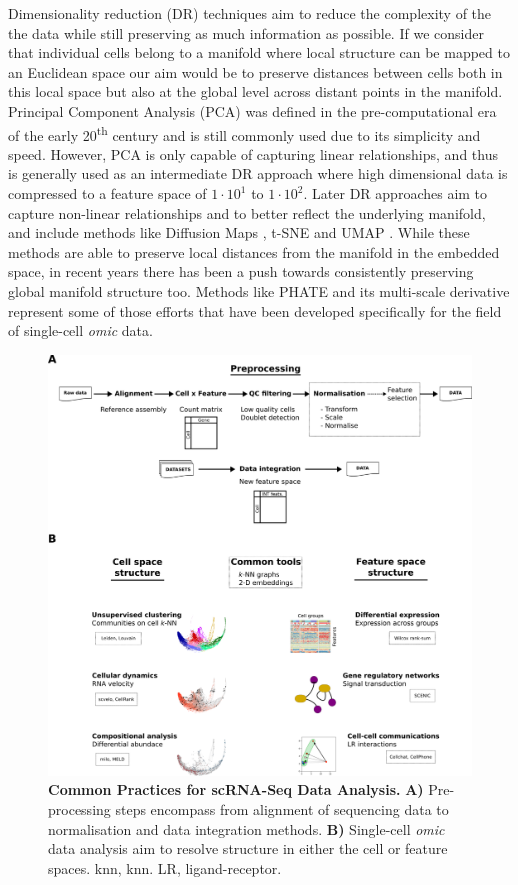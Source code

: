 Dimensionality reduction (DR) techniques aim to reduce the complexity of the the data while still preserving as much information as possible. If we consider that individual cells belong to a manifold where local structure can be mapped to an Euclidean space our aim would be to preserve distances between cells both in this local space but also at the global level across distant points in the manifold. Principal Component Analysis (PCA) \cite{pearson_liii_1901,jolliffe_principal_2016} was defined in the pre-computational era of the early 20\textsuperscript{th} century and is still commonly used due to its simplicity and speed. However, PCA is only capable of capturing linear relationships, and thus is generally used as an intermediate DR approach where high dimensional data is compressed to a feature space of \(1\cdot10^1\) to \(1\cdot10^2\). Later DR approaches aim to capture non-linear relationships and to better reflect the underlying manifold, and include methods like Diffusion Maps \cite{coifman_diffusion_2006}, t-SNE \cite{van_der_maaten_visualizing_2008} and UMAP \cite{mcinnes_umap_2020}. While these methods are able to preserve local distances from the manifold in the embedded space, in recent years there has been a push towards consistently preserving global manifold structure too. Methods like PHATE \cite{moon_visualizing_2019} and its multi-scale derivative \cite{kuchroo_multiscale_2020} represent some of those efforts that have been developed specifically for the field of single-cell \emph{omic} data.

\begin{figure}[H]
    \centering
    \includegraphics{01intro/figs/1COMP_analysis.png}
    \caption{\textbf{Common Practices for scRNA-Seq Data Analysis.} \textbf{A)} Pre-processing steps encompass from alignment of sequencing data to normalisation and data integration methods. \textbf{B)} Single-cell \emph{omic} data analysis aim to resolve structure in either the cell or feature spaces. \acrshort{knn}, \acrlong{knn}. LR, ligand-receptor.}
    \label{fig:1pipe}
\end{figure}

